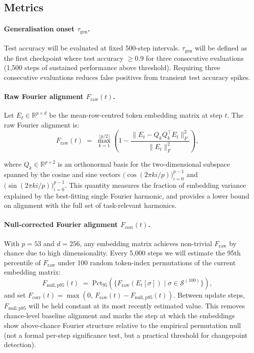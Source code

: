 \documentclass[12pt,openany,oneside,a4paper]{book}
\newcommand{\taug}{\tau_{\mathrm{gen}}}
\newcommand{\fcorr}{F_{\mathrm{corr}}}
\begin{document}
\subsection{Metrics}
\label{sec:metrics}

\paragraph{Generalisation onset $\taug$.}
Test accuracy will be evaluated at fixed 500-step intervals.
$\taug$ will be defined as the first checkpoint where test accuracy
$\geq 0.9$ for three consecutive evaluations (1{,}500 steps of
sustained performance above threshold).
Requiring three consecutive evaluations reduces false positives from
transient test accuracy spikes.

\paragraph{Raw Fourier alignment $F_{\mathrm{raw}}(t)$.}
Let $E_t \in \mathbb{R}^{p \times d}$ be the mean-row-centred token
embedding matrix at step $t$.
The raw Fourier alignment is:
\begin{equation}
  F_{\mathrm{raw}}(t) \;=\;
  \max_{k=1}^{\lfloor p/2\rfloor}
  \!\left(1 - \frac{\|E_t - Q_k Q_k^\top E_t\|_F^2}
  {\|E_t\|_F^2}\right),
  \label{eq:f_raw}
\end{equation}
{\sloppy
where $Q_k\in\mathbb{R}^{p\times 2}$ is an orthonormal basis for
the two-dimensional subspace spanned by the cosine and sine
vectors $\bigl(\cos(2\pi k i/p)\bigr)_{i=0}^{p-1}$ and
$\bigl(\sin(2\pi k i/p)\bigr)_{i=0}^{p-1}$.
This quantity measures the fraction of embedding variance explained
by the best-fitting single Fourier harmonic, and provides a lower
bound on alignment with the full set of task-relevant harmonics.\par}

\paragraph{Null-corrected Fourier alignment $\fcorr(t)$.}
With $p=53$ and $d=256$, any embedding matrix achieves non-trivial
$F_{\mathrm{raw}}$ by chance due to high dimensionality.
Every 5{,}000 steps we will estimate the 95th percentile of
$F_{\mathrm{raw}}$ under 100 random token-index permutations of the
current embedding matrix:
\begin{equation}
  F_{\mathrm{null,p95}}(t) \;=\;
  \mathrm{Pct}_{95}\!\left(
    \{F_{\mathrm{raw}}(E_t[\sigma]) \mid \sigma \in \mathcal{S}^{(100)}\}
  \right),
\end{equation}
and set $\fcorr(t) = \max(0,\, F_{\mathrm{raw}}(t) - F_{\mathrm{null,p95}}(t))$.
Between update steps, $F_{\mathrm{null,p95}}$ will be held constant at its
most recently estimated value.
This removes chance-level baseline alignment and marks the step at
which the embeddings show above-chance Fourier structure relative to
the empirical permutation null (not a formal per-step significance
test, but a practical threshold for changepoint detection).
\end{document}
